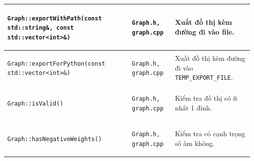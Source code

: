 \documentclass[14pt,a4paper]{report}
\begin{document}
\begin{longtable}{|>{\bfseries\raggedright\arraybackslash}p{}|
                   >{\bfseries\raggedright\arraybackslash}p{2.8cm}|
                   >{\raggedright\arraybackslash}p{}|}
\texttt{Graph::exportWithPath(const std::string\&, const std::vector<int>\&)} & \texttt{Graph.h, graph.cpp} & Xuất đồ thị kèm đường đi vào file.\\ \hline
\texttt{Graph::exportForPython(const std::vector<int>\&)} & \texttt{Graph.h, graph.cpp} & Xuất đồ thị kèm đường đi vào \texttt{TEMP\_EXPORT\_FILE}.\\ \hline
\texttt{Graph::isValid()} & \texttt{Graph.h, graph.cpp} & Kiểm tra đồ thị có ít nhất 1 đỉnh.\\ \hline
\texttt{Graph::hasNegativeWeights()} & \texttt{Graph.h, graph.cpp} & Kiểm tra có cạnh trọng số âm không.\\ \hline

\end{longtable}

\renewcommand{\arraystretch}{1.15}
\setlength{\tabcolsep}{6pt}
\end{document}
